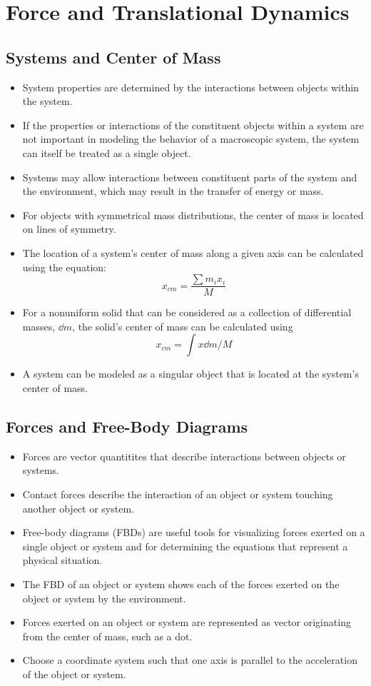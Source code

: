 \documentclass[../mech.tex]{subfiles}
\begin{document}
\chapter{Force and Translational Dynamics}
\section{Systems and Center of Mass}
\begin{itemize}
    \item System properties are determined by the interactions between objects within the system.
    \item If the properties or interactions of the constituent objects within a system are not important in modeling the behavior of a macroscopic system, the system can itself be treated as a single object.
    \item Systems may allow interactions between constituent parts of the system and the environment, which may result in the transfer of energy or mass.
    \item For objects with symmetrical mass distributions, the center of mass is located on lines of symmetry.
    \item The location of a system's center of mass along a given axis can be calculated using the equation:
    \[ x_{cm}=\frac{\sum m_ix_i}{M}\] 
    \item For a nonuniform solid that can be considered as a collection of differential masses, $\dd m$, the solid's center of mass can be calculated using 
    \[ x_{cm}=\int x\dd m/M \]
    \item A system can be modeled as a singular object that is located at the system's center of mass.
\end{itemize}

\section{Forces and Free-Body Diagrams}
\begin{itemize}
    \item Forces are vector quantitites that describe interactions between objects or systems.
    \item Contact forces describe the interaction of an object or system touching another object or system.
    \item Free-body diagrams (FBDs) are useful tools for visualizing forces exerted on a single object or system and for determining the equations that represent a physical situation.
    \item The FBD of an object or system shows each of the forces exerted on the object or system by the environment.
    \item Forces exerted on an object or system are represented as vector originating from the center of mass, such as a dot.
    \item Choose a coordinate system such that one axis is parallel to the acceleration of the object or system.
\end{itemize}
\end{document}
